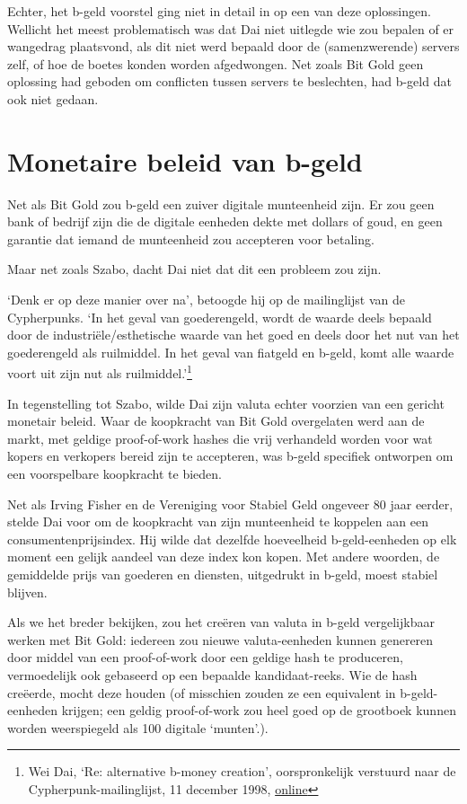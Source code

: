 \documentclass[
  a5paper,
  smalldemyvopaper,11pt,twoside,onecolumn,openright,extrafontsizes]{memoir}
\begin{document}
Echter, het b-geld voorstel ging niet in detail in op een van deze
oplossingen. Wellicht het meest problematisch was dat Dai niet uitlegde
wie zou bepalen of er wangedrag plaatsvond, als dit niet werd bepaald
door de (samenzwerende) servers zelf, of hoe de boetes konden worden
afgedwongen. Net zoals Bit Gold geen oplossing had geboden om conflicten
tussen servers te beslechten, had b-geld dat ook niet gedaan.

\section{Monetaire beleid van b-geld}\label{monetaire-beleid-van-b-geld}

Net als Bit Gold zou b-geld een zuiver digitale munteenheid zijn. Er zou
geen bank of bedrijf zijn die de digitale eenheden dekte met dollars of
goud, en geen garantie dat iemand de munteenheid zou accepteren voor
betaling.

Maar net zoals Szabo, dacht Dai niet dat dit een probleem zou zijn.

`Denk er op deze manier over na', betoogde hij op de mailinglijst van de
Cypherpunks. `In het geval van goederengeld, wordt de waarde deels
bepaald door de industriële/esthetische waarde van het goed en deels
door het nut van het goederengeld als ruilmiddel. In het geval van
fiatgeld en b-geld, komt alle waarde voort uit zijn nut als
ruilmiddel.'\footnote{Wei Dai, `Re: alternative b-money creation',
  oorspronkelijk verstuurd naar de Cypherpunk-mailinglijst, 11 december
  1998,
  \href{https://cypherpunks.venona.com/date/1998/12/msg00448.html}{online}}

In tegenstelling tot Szabo, wilde Dai zijn valuta echter voorzien van
een gericht monetair beleid. Waar de koopkracht van Bit Gold overgelaten
werd aan de markt, met geldige proof-of-work hashes die vrij verhandeld
worden voor wat kopers en verkopers bereid zijn te accepteren, was
b-geld specifiek ontworpen om een voorspelbare koopkracht te bieden.

Net als Irving Fisher en de Vereniging voor Stabiel Geld ongeveer 80
jaar eerder, stelde Dai voor om de koopkracht van zijn munteenheid te
koppelen aan een consumentenprijsindex. Hij wilde dat dezelfde
hoeveelheid b-geld-eenheden op elk moment een gelijk aandeel van deze
index kon kopen. Met andere woorden, de gemiddelde prijs van goederen en
diensten, uitgedrukt in b-geld, moest stabiel blijven.

Als we het breder bekijken, zou het creëren van valuta in b-geld
vergelijkbaar werken met Bit Gold: iedereen zou nieuwe valuta-eenheden
kunnen genereren door middel van een proof-of-work door een geldige hash
te produceren, vermoedelijk ook gebaseerd op een bepaalde
kandidaat-reeks. Wie de hash creëerde, mocht deze houden (of misschien
zouden ze een equivalent in b-geld-eenheden krijgen; een geldig
proof-of-work zou heel goed op de grootboek kunnen worden weerspiegeld
als 100 digitale `munten'.).
\end{document}

